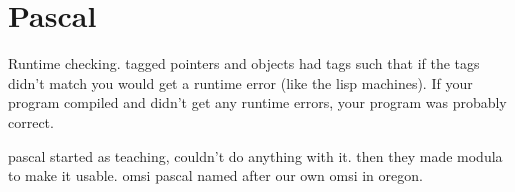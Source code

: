 \section{Pascal}
\label{sec:pascal}

Runtime checking. tagged pointers and objects had tags such that if the tags didn't
match you would get a runtime error (like the lisp machines).
If your program compiled and didn't get any
runtime errors, your program was probably correct.

pascal started as teaching, couldn't do anything with it.
then they made modula to make it usable.
omsi pascal named after our own omsi in oregon.



